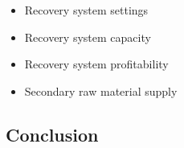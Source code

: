     \begin{itemize}
        \item Recovery system settings
        \item Recovery system capacity
        \item Recovery system profitability
        \item Secondary raw material supply
    \end{itemize}

\subsectionEndline

\clearpage

\clearpage

\clearpage

\clearpage

% 
\clearpage

\subsection{Conclusion}

